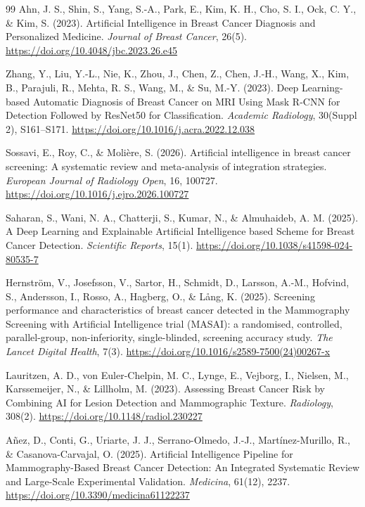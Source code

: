 \begin{thebibliography}{99}
Ahn, J. S., Shin, S., Yang, S.-A., Park, E., Kim, K. H., Cho, S. I., Ock, C. Y., \& Kim, S. (2023). Artificial Intelligence in Breast Cancer Diagnosis and Personalized Medicine. \emph{Journal of Breast Cancer}, 26(5). \url{https://doi.org/10.4048/jbc.2023.26.e45}

Zhang, Y., Liu, Y.-L., Nie, K., Zhou, J., Chen, Z., Chen, J.-H., Wang, X., Kim, B., Parajuli, R., Mehta, R. S., Wang, M., \& Su, M.-Y. (2023). Deep Learning-based Automatic Diagnosis of Breast Cancer on MRI Using Mask R-CNN for Detection Followed by ResNet50 for Classification. \emph{Academic Radiology}, 30(Suppl 2), S161--S171. \url{https://doi.org/10.1016/j.acra.2022.12.038}

Sossavi, E., Roy, C., \& Moli\`ere, S. (2026). Artificial intelligence in breast cancer screening: A systematic review and meta-analysis of integration strategies. \emph{European Journal of Radiology Open}, 16, 100727. \url{https://doi.org/10.1016/j.ejro.2026.100727}

Saharan, S., Wani, N. A., Chatterji, S., Kumar, N., \& Almuhaideb, A. M. (2025). A Deep Learning and Explainable Artificial Intelligence based Scheme for Breast Cancer Detection. \emph{Scientific Reports}, 15(1). \url{https://doi.org/10.1038/s41598-024-80535-7}

Hernstr\"om, V., Josefsson, V., Sartor, H., Schmidt, D., Larsson, A.-M., Hofvind, S., Andersson, I., Rosso, A., Hagberg, O., \& L\r{a}ng, K. (2025). Screening performance and characteristics of breast cancer detected in the Mammography Screening with Artificial Intelligence trial (MASAI): a randomised, controlled, parallel-group, non-inferiority, single-blinded, screening accuracy study. \emph{The Lancet Digital Health}, 7(3). \url{https://doi.org/10.1016/s2589-7500(24)00267-x}

Lauritzen, A. D., von Euler-Chelpin, M. C., Lynge, E., Vejborg, I., Nielsen, M., Karssemeijer, N., \& Lillholm, M. (2023). Assessing Breast Cancer Risk by Combining AI for Lesion Detection and Mammographic Texture. \emph{Radiology}, 308(2). \url{https://doi.org/10.1148/radiol.230227}

A\~nez, D., Conti, G., Uriarte, J. J., Serrano-Olmedo, J.-J., Mart\'inez-Murillo, R., \& Casanova-Carvajal, O. (2025). Artificial Intelligence Pipeline for Mammography-Based Breast Cancer Detection: An Integrated Systematic Review and Large-Scale Experimental Validation. \emph{Medicina}, 61(12), 2237. \url{https://doi.org/10.3390/medicina61122237}

\end{thebibliography}

